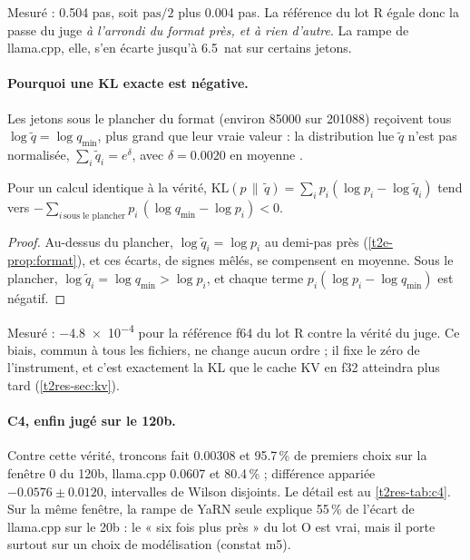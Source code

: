 Mesuré : \num{0.504} pas, soit $\text{pas}/2$ plus \num{0.004} pas. La référence du lot R égale donc la passe du juge \emph{à l'arrondi du format près, et à rien d'autre}. La rampe de llama.cpp, elle, s'en écarte jusqu'à \SI{6.5}{nat} sur certains jetons.

\paragraph{Pourquoi une KL exacte est négative.} Les jetons sous le plancher du format (environ \num{85000} sur \num{201088}) reçoivent tous $\log \tilde q = \log q_{\min}$, plus grand que leur vraie valeur : la distribution lue $\tilde q$ n'est pas normalisée, $\sum_i \tilde q_i = e^{\delta}$, avec $\delta = \num{0.0020}$ en moyenne \mes.

\begin{lemme}\label{t2e-lem:kl-negative}
Pour un calcul identique à la vérité, $\mathrm{KL}(p\,\|\,\tilde q) = \sum_i p_i (\log p_i - \log \tilde q_i)$ tend vers $-\sum_{i \,\text{sous le plancher}} p_i\,(\log q_{\min} - \log p_i) < 0$.
\end{lemme}
\begin{proof}
Au-dessus du plancher, $\log \tilde q_i = \log p_i$ au demi-pas près (\cref{t2e-prop:format}), et ces écarts, de signes mêlés, se compensent en moyenne. Sous le plancher, $\log \tilde q_i = \log q_{\min} > \log p_i$, et chaque terme $p_i(\log p_i - \log q_{\min})$ est négatif.
\end{proof}

Mesuré : \num{-4.8e-4} pour la référence f64 du lot R contre la vérité du juge. Ce biais, commun à tous les fichiers, ne change aucun ordre ; il fixe le zéro de l'instrument, et c'est exactement la KL que le cache KV en f32 atteindra plus tard (\cref{t2res-sec:kv}).

\paragraph{C4, enfin jugé sur le 120b.} Contre cette vérité, troncons fait \num{0.00308} et \num{95.7}\,\% de premiers choix sur la fenêtre 0 du 120b, llama.cpp \num{0.0607} et \num{80.4}\,\% ; différence appariée $-\num{0.0576} \pm \num{0.0120}$, intervalles de Wilson disjoints. Le détail est au \cref{t2res-tab:c4}. Sur la même fenêtre, la rampe de YaRN seule explique \num{55}\,\% de l'écart de llama.cpp sur le 20b : le « six fois plus près » du lot O est vrai, mais il porte surtout sur un choix de modélisation (constat m5).

